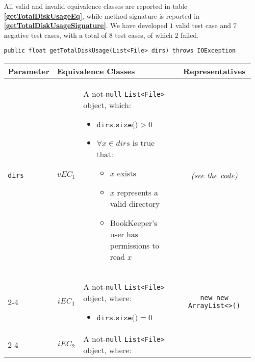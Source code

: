 \documentclass[sigconf]{acmart}
\begin{document}
All valid and invalid equivalence classes are reported in table \textbf{\cref{getTotalDiskUsageEq}}, while method signature is reported in \textbf{\cref{getTotalDiskUsageSignature}}. We have developed $1$ valid test case and $7$ negative test cases, with a total of $8$ test cases, of which $2$ failed.

\begin{lstlisting}[frame=lines,basicstyle=\ttfamily\tiny, caption={Signature of method \texttt{getTotalDiskUsage}}, label={getTotalDiskUsageSignature}]
public float getTotalDiskUsage(List<File> dirs) throws IOException
\end{lstlisting}

\begin{table*}
\footnotesize
\caption{Equivalence classes and representatives of \texttt{getTotalDiskUsage} method}
\label{getTotalDiskUsageEq}
\centering
\begin{tabular}{l|cm{10.5cm}|c}
\toprule

    \textbf{Parameter} & \multicolumn{2}{|l|}{\textbf{Equivalence Classes}} & \textbf{Representatives} \\
    \midrule
    
	\texttt{dirs} & $vEC_1$ & A not-\texttt{null} \texttt{List<File>} object, which: 
	
	\begin{itemize}
	\item $\texttt{dirs.size()} > 0$
	\item $\forall x \in dirs$ is true that:
	\begin{itemize}
	\item $x$ exists
	\item $x$ represents a valid directory
	\item BookKeeper's user has permissions to read $x$ 
	\end{itemize}
	\end{itemize}
	
	& \textit{(see the code)}
    
    \\\cline{2-4}   
    & $iEC_1$ & A not-\texttt{null} \texttt{List<File>} object, where: 
    
    \begin{itemize}
	\item $\texttt{dirs.size()} = 0$
	\end{itemize}
    
    & \texttt{new new ArrayList<>()}
    
    \\\cline{2-4}   
    & $iEC_2$ & A not-\texttt{null} \texttt{List<File>} object, where: 
    

\end{tabular}
\end{table*}
\end{document}
